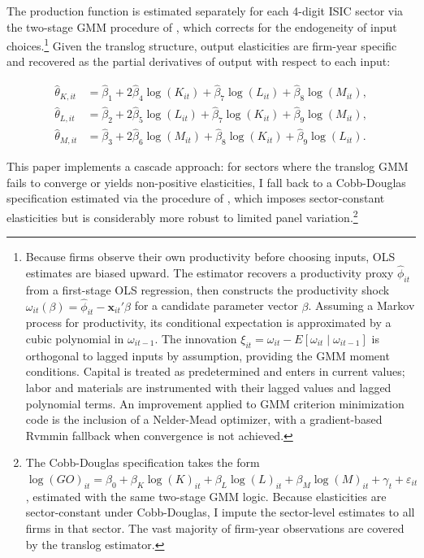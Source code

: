 \documentclass[12pt]{article}
\begin{document}
The production function is estimated separately for each 4-digit ISIC sector via the two-stage GMM procedure of \textcite{de_loecker_rise_2020}, which corrects for the endogeneity of input choices.\footnote{Because firms observe their own productivity before choosing inputs, OLS estimates are biased upward. The estimator recovers a productivity proxy $\hat{\phi}_{it}$ from a first-stage OLS regression, then constructs the productivity shock $\omega_{it}(\beta) = \hat{\phi}_{it} - \mathbf{x}_{it}'\beta$ for a candidate parameter vector $\beta$. Assuming a Markov process for productivity, its conditional expectation is approximated by a cubic polynomial in $\omega_{it-1}$. The innovation $\xi_{it} = \omega_{it} - E[\omega_{it} \mid \omega_{it-1}]$ is orthogonal to lagged inputs by assumption, providing the GMM moment conditions. Capital is treated as predetermined and enters in current values; labor and materials are instrumented with their lagged values and lagged polynomial terms. An improvement applied to \textcite{de_loecker_rise_2020} GMM criterion minimization code is the inclusion of a Nelder-Mead optimizer, with a gradient-based Rvmmin fallback when convergence is not achieved.} Given the translog structure, output elasticities are firm-year specific and recovered as the partial derivatives of output with respect to each input:

\begin{equation}
\begin{aligned}
    \hat{\theta}_{K,it} &= \hat{\beta}_{1} + 2\hat{\beta}_{4}\log(K_{it}) + \hat{\beta}_{7}\log(L_{it}) + \hat{\beta}_{8}\log(M_{it}), \\
    \hat{\theta}_{L,it} &= \hat{\beta}_{2} + 2\hat{\beta}_{5}\log(L_{it}) + \hat{\beta}_{7}\log(K_{it}) + \hat{\beta}_{9}\log(M_{it}), \\
    \hat{\theta}_{M,it} &= \hat{\beta}_{3} + 2\hat{\beta}_{6}\log(M_{it}) + \hat{\beta}_{8}\log(K_{it}) + \hat{\beta}_{9}\log(L_{it}).
\end{aligned}
\end{equation}

This paper implements a cascade approach: for sectors where the translog GMM fails to converge or yields non-positive  elasticities, I fall back to a Cobb-Douglas specification estimated via the procedure of \textcite{ackerberg_identification_2015}, which imposes sector-constant elasticities but is considerably more robust to limited panel variation.\footnote{The Cobb-Douglas specification takes the form  $\log(\mathit{GO})_{it} = \beta_0 + \beta_K \log(K)_{it} + \beta_L \log(L)_{it} + \beta_M \log(M)_{it} + \gamma_t + \varepsilon_{it}$, estimated with the same two-stage GMM logic. Because elasticities are sector-constant under Cobb-Douglas, I impute the sector-level estimates to all firms in that sector. The vast majority of firm-year observations are covered by the translog estimator.}
\end{document}
